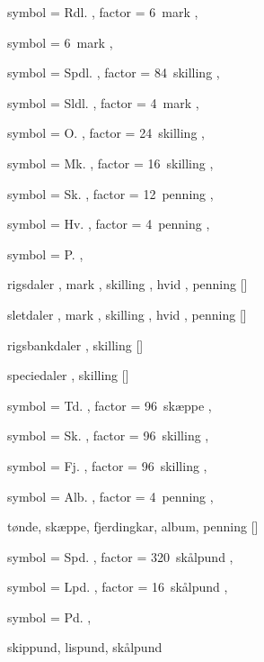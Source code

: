 
 {
	symbol = { Rdl. } ,
	factor = { 6~mark } ,
}

 {
	symbol = { 6~mark } ,
}

 {
	symbol = { Spdl. } ,
	factor = { 84~skilling } ,
}

 {
	symbol = { Sldl. } ,
	factor = { 4~mark } ,
}

 {
	symbol = { O. } ,
	factor = { 24~skilling } ,
}

 {
	symbol = { Mk. } ,
	factor = { 16~skilling } ,
}

 {
	symbol = { Sk. } ,
	factor = { 12~penning } ,
}

 {
	symbol = { Hv. } ,
	factor = { 4~penning } ,
}

 {
	symbol = { P. } ,
}

 {
	rigsdaler ,
	mark ,
	skilling ,
	hvid ,
	penning
}[\rdl]

 {
	sletdaler ,
	mark ,
	skilling ,
	hvid ,
	penning
}[\sldl]

 {
	rigsbankdaler ,
	skilling
}[\rbdl]

 {
	speciedaler ,
	skilling
}[\spdl]


 {
	symbol = { Td. } ,
	factor = { 96~skæppe } ,
}

 {
	symbol = { Sk. } ,
	factor = { 96~skilling } ,
}

 {
	symbol = { Fj. } ,
	factor = { 96~skilling } ,
}

 {
	symbol = { Alb. } ,
	factor = { 4~penning } ,
}

 {
	tønde,
	skæppe,
	fjerdingkar,
	album,
	penning
}[\hartkorn]


 {
	symbol = { Spd. } ,
	factor = { 320~skålpund } ,
}

 {
	symbol = { Lpd. } ,
	factor = { 16~skålpund } ,
}

 {
	symbol = { Pd. } ,
}

 {
	skippund,
	lispund,
	skålpund
}
